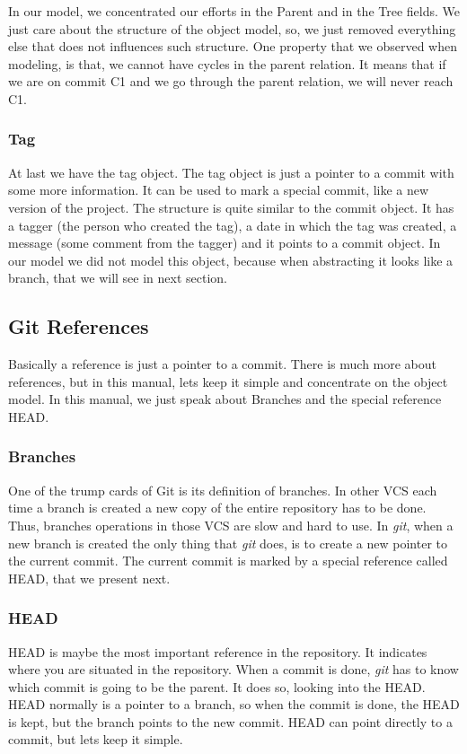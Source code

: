 In our model, we concentrated our efforts in the Parent and in the
Tree fields. We just care about the structure of the object model, so,
we just removed everything else that does not influences such
structure. One property that we observed when modeling, is that, we
cannot have cycles in the parent relation. It means that if we are
on commit C1 and we go through the parent relation, we will never
reach C1.

\subsubsection{Tag}
At last we have the tag object. The tag object is just a pointer to
a commit with some more information. It can be used to mark a special 
commit, like a new version of the project. The structure is quite 
similar to the commit object. It has a tagger (the person who created 
the tag), a date in which the tag was created, a message (some
comment from the tagger) and it points to a commit object. In our
model we did not model this object, because when abstracting it looks
like a branch, that we will see in next section.

\subsection{Git References}
Basically a reference is just a pointer to a commit. There is much
more about references, but in this manual, lets keep it simple and
concentrate on the object model. In this manual, we just speak about
Branches and the special reference HEAD.

\subsubsection{Branches}
One of the trump cards of Git is its definition of branches. In other
VCS each time a branch is created a new copy of the entire repository
has to be done. Thus, branches operations in those VCS are slow and hard to use. 
In \emph{git}, when a new branch is created the only thing that
\emph{git} does, is to create a new pointer to the current
commit. The current commit is marked by a special reference called
HEAD, that we present next.

\subsubsection{HEAD}
HEAD is maybe the most important reference in the repository. It
indicates where you are situated in the repository. When a commit is
done, \emph{git} has to know which commit is going to be the parent. 
It does so, looking into the HEAD. HEAD normally is a
pointer to a branch, so when the commit is done, the HEAD is kept, but
the branch points to the new commit. HEAD can point directly to a
commit, but lets keep it simple.

